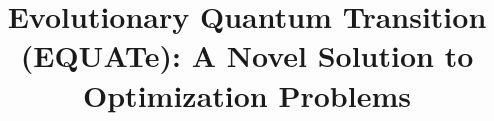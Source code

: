 \documentclass[conference]{IEEEtran}
\begin{document}
\title{Evolutionary Quantum Transition (EQUATe): A Novel Solution to Optimization Problems \\
}


\maketitle
\end{document}
